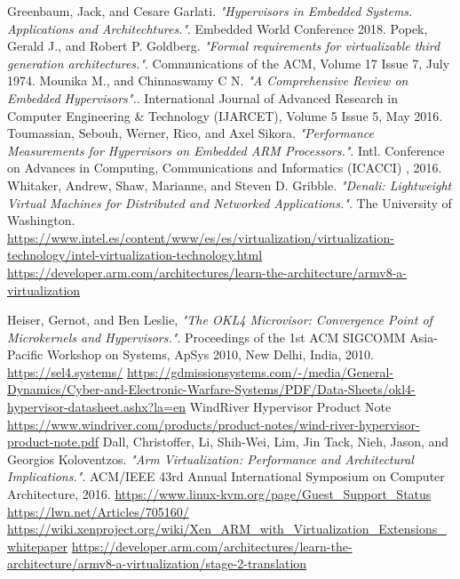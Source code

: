 \documentclass[spanish,12pt,a4paper,oneside]{book}
\begin{document}
\begin{thebibliography}{00}

	  Greenbaum, Jack, and Cesare Garlati. \emph{"Hypervisors in Embedded Systems. Applications and Architechtures."}. Embedded World Conference 2018.
	 Popek, Gerald J., and Robert P. Goldberg. \emph{"Formal requirements for virtualizable third generation architectures."}. Communications of the ACM, Volume 17 Issue 7, July 1974.
	 Mounika M., and Chinnaswamy C N. \emph{"A Comprehensive Review on Embedded Hypervisors".}. International Journal of Advanced Research in Computer Engineering \& Technology (IJARCET), Volume 5 Issue 5, May 2016.
	 Toumassian, Sebouh, Werner, Rico, and Axel Sikora. \emph{"Performance Measurements for Hypervisors on Embedded ARM Processors."}. Intl. Conference on Advances in Computing, Communications and Informatics (ICACCI) , 2016.
	 Whitaker, Andrew, Shaw, Marianne, and Steven D. Gribble. \emph{"Denali: Lightweight Virtual Machines for Distributed and Networked Applications."}. The University of Washington.
   \url{https://www.intel.es/content/www/es/es/virtualization/virtualization-technology/intel-virtualization-technology.html}
   \url{https://developer.arm.com/architectures/learn-the-architecture/armv8-a-virtualization}

   Heiser, Gernot, and Ben Leslie, \emph{"The OKL4 Microvisor: Convergence Point of Microkernels and Hypervisors."}. Proceedings of the 1st ACM SIGCOMM Asia-Pacific Workshop on Systems, ApSys 2010, New Delhi, India, 2010.
   \url{https://sel4.systems/}
   \url{https://gdmissionsystems.com/-/media/General-Dynamics/Cyber-and-Electronic-Warfare-Systems/PDF/Data-Sheets/okl4-hypervisor-datasheet.ashx?la=en}
   WindRiver Hypervisor Product Note \url{https://www.windriver.com/products/product-notes/wind-river-hypervisor-product-note.pdf}
   Dall, Christoffer, Li, Shih-Wei, Lim, Jin Tack, Nieh, Jason, and Georgios Koloventzos. \emph{"Arm Virtualization: Performance and Architectural Implications."}. ACM/IEEE 43rd Annual International Symposium on Computer Architecture, 2016.
   \url{https://www.linux-kvm.org/page/Guest_Support_Status}
	 \url{https://lwn.net/Articles/705160/}
   \url{https://wiki.xenproject.org/wiki/Xen_ARM_with_Virtualization_Extensions_whitepaper}
   \url{https://developer.arm.com/architectures/learn-the-architecture/armv8-a-virtualization/stage-2-translation}




\end{thebibliography}
\end{document}
